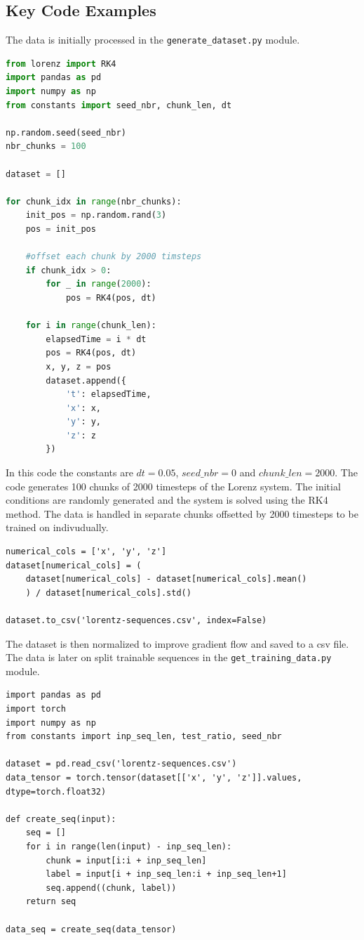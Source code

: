\documentclass[11pt]{article}
\begin{document}
\subsection{Key Code Examples}

The data is initially processed in the \texttt{generate\_dataset.py} module.

\begin{lstlisting}[language=Python]
from lorenz import RK4  
import pandas as pd
import numpy as np
from constants import seed_nbr, chunk_len, dt

np.random.seed(seed_nbr)
nbr_chunks = 100

dataset = []

for chunk_idx in range(nbr_chunks):
    init_pos = np.random.rand(3)
    pos = init_pos

    #offset each chunk by 2000 timsteps
    if chunk_idx > 0:
        for _ in range(2000):
            pos = RK4(pos, dt)
    
    for i in range(chunk_len):
        elapsedTime = i * dt
        pos = RK4(pos, dt)
        x, y, z = pos
        dataset.append({
            't': elapsedTime,
            'x': x,
            'y': y,
            'z': z
        })
\end{lstlisting}

In this code the constants are $dt = 0.05$, $seed\_nbr = 0$ and $chunk\_len = 2000$. The code generates 100 chunks of 2000 timesteps of the Lorenz system. The initial conditions are randomly generated and the system is solved using the RK4 method. The data is handled in separate chunks offsetted by 2000 timesteps to be trained on indivudually. 

\begin{lstlisting}
numerical_cols = ['x', 'y', 'z']
dataset[numerical_cols] = (
    dataset[numerical_cols] - dataset[numerical_cols].mean()
    ) / dataset[numerical_cols].std()

dataset.to_csv('lorentz-sequences.csv', index=False)
\end{lstlisting}

The dataset is then normalized to improve gradient flow and saved to a csv file. \\

The data is later on split trainable sequences in the \texttt{get\_training\_data.py} module.
\begin{lstlisting}
import pandas as pd
import torch
import numpy as np
from constants import inp_seq_len, test_ratio, seed_nbr

dataset = pd.read_csv('lorentz-sequences.csv')
data_tensor = torch.tensor(dataset[['x', 'y', 'z']].values, dtype=torch.float32)

def create_seq(input):
    seq = []
    for i in range(len(input) - inp_seq_len):
        chunk = input[i:i + inp_seq_len]
        label = input[i + inp_seq_len:i + inp_seq_len+1]
        seq.append((chunk, label))
    return seq

data_seq = create_seq(data_tensor)
    
\end{lstlisting}
\end{document}
